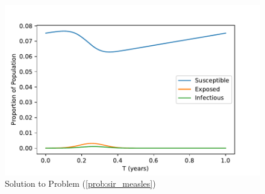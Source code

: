 \begin{figure}[ht]
\centering
\includegraphics[width=\textwidth]{measles.pdf}
\caption{Solution to Problem (\ref{prob:sir_measles})}
\label{fig:sir4}
\end{figure}